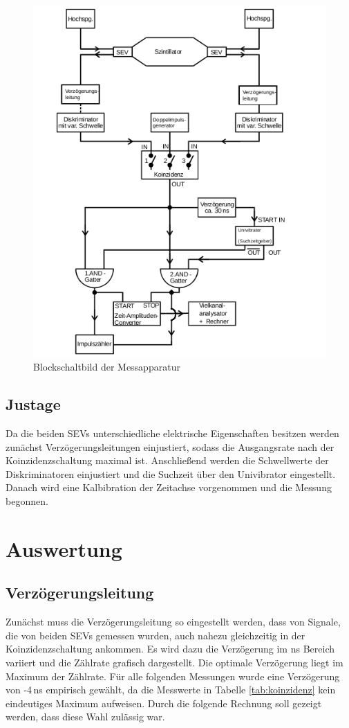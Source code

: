 \begin{figure}[H]
	\centering
	\includegraphics[width=0.8\linewidth,height=0.8\textheight,keepaspectratio]{Bilder/blockAdaptiert.png}
	\caption{Blockschaltbild der Messapparatur \cite[adaptiert]{Anl}}
	\label{FIG:Aufbau}
\end{figure}

\subsection{Justage}
Da die beiden SEVs unterschiedliche elektrische Eigenschaften besitzen werden zunächst Verzögerungsleitungen einjustiert, sodass die Ausgangsrate nach der Koinzidenzschaltung maximal ist. Anschließend werden die Schwellwerte der Diskriminatoren einjustiert und die Suchzeit über den Univibrator eingestellt. Danach wird eine Kalbibration der Zeitachse vorgenommen und die Messung begonnen.

\section{Auswertung}

\subsection{Verzögerungsleitung}
Zunächst muss die Verzögerungsleitung so eingestellt werden, dass von Signale, die von beiden SEVs gemessen wurden, auch nahezu gleichzeitig in der Koinzidenzschaltung ankommen. Es wird dazu die Verzögerung im ns Bereich variiert und die Zählrate grafisch dargestellt. Die optimale Verzögerung liegt im Maximum der Zählrate.
Für alle folgenden Messungen wurde eine Verzögerung von -4\,\si{ns} empirisch gewählt, da die Messwerte in Tabelle \ref{tab:koinzidenz} kein eindeutiges Maximum aufweisen. Durch die folgende Rechnung soll gezeigt werden, dass diese Wahl zulässig war. 

